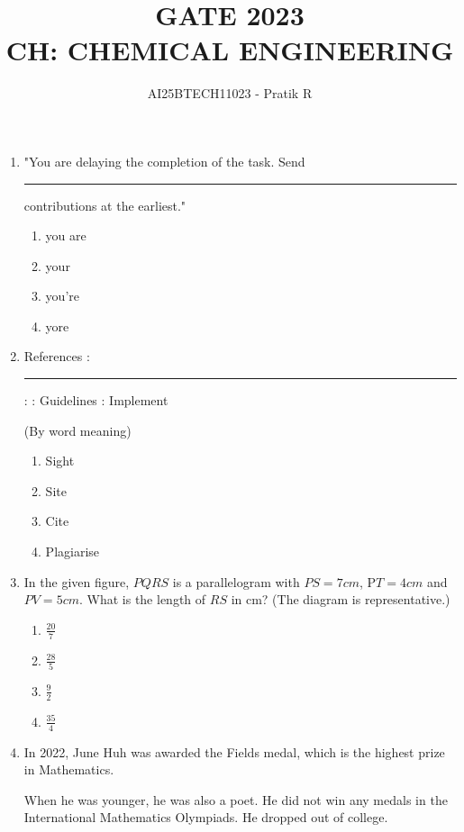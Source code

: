 \documentclass[journal,12pt,onecolumn]{IEEEtran}
\theoremstyle{remark}
\begin{document}
\title{
GATE 2023 \\
CH: CHEMICAL ENGINEERING}
\author{AI25BTECH11023 - Pratik R}
\maketitle
\renewcommand{\thefigure}{\theenumi}

\begin{enumerate}
    \item "You are delaying the completion of the task. Send \rule{40pt}{0.1mm} contributions at the
earliest."

\hfill{}
\begin{enumerate}
    \item you are
    \item your
    \item you're
    \item yore
\end{enumerate}

    \item References : \rule{40pt}{0.1mm} : : Guidelines : Implement
    
    (By word meaning)
    
\hfill{}
\begin{enumerate}
    \item Sight
    \item Site
    \item Cite
    \item Plagiarise
\end{enumerate}

    \item In the given figure, $PQRS$ is a parallelogram with $PS = 7 cm$, P$T = 4 cm$ and $PV = 5 cm$. What is the length of $RS$ in cm? (The diagram is representative.)
    
\hfill{}
\begin{enumerate}
    \item $\frac{20}{7}$
    \item $\frac{28}{5}$
    \item $\frac{9}{2}$
    \item $\frac{35}{4}$
\end{enumerate}

\item In 2022, June Huh was awarded the Fields medal, which is the highest prize in
Mathematics.

When he was younger, he was also a poet. He did not win any medals in the
International Mathematics Olympiads. He dropped out of college.


\end{enumerate}
\end{document}
